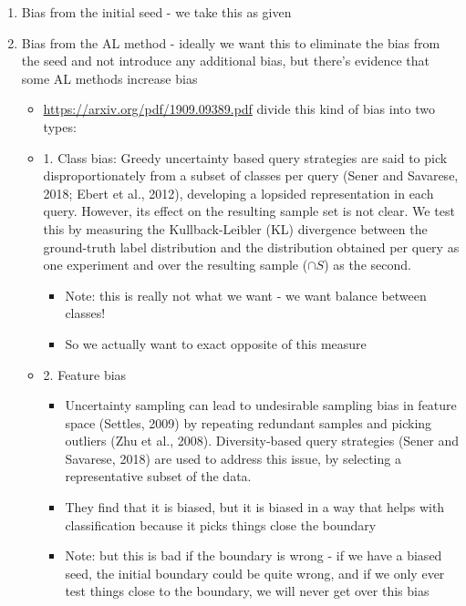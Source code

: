 \documentclass[11pt]{article}
\begin{document}
\begin{enumerate}
    \item Bias from the initial seed -  we take this as given 
    \item Bias from the AL method - ideally we want this to eliminate the bias from the seed and not introduce any additional bias, but there’s evidence that some AL methods increase bias 
    \begin{itemize}
        \item \url{https://arxiv.org/pdf/1909.09389.pdf} divide this kind of bias into two types:
\item 1. Class bias: Greedy uncertainty based query strategies are said to pick disproportionately from a subset of classes per query (Sener and Savarese, 2018; Ebert et al., 2012), developing a lopsided representation in each query. However, its effect on the resulting sample set is not clear. We test this by measuring the  Kullback-Leibler (KL) divergence between the ground-truth label distribution and the distribution obtained per query  as one experiment and over the resulting sample ($\cap S$) as the second. 
\begin{itemize}
\item Note: this is really not what we want - we want balance between classes! 
\item So we actually want to exact opposite of this measure 
    \end{itemize}
\item 2. Feature bias 
\begin{itemize}
\item Uncertainty sampling can lead to undesirable sampling bias in feature space (Settles, 2009) by repeating redundant samples and picking outliers (Zhu et al., 2008). Diversity-based query strategies (Sener and Savarese, 2018) are used to address this issue, by selecting a representative subset of the data.
\item They find that it is biased, but it is biased in a way that helps with classification because it picks things close the boundary 
\item Note: but this is bad if the boundary is wrong - if we have a biased seed, the initial boundary could be quite wrong, and if we only ever test things close to the boundary, we will never get over this bias 
\end{itemize}
    \end{itemize}    
\end{enumerate}
\end{document}
